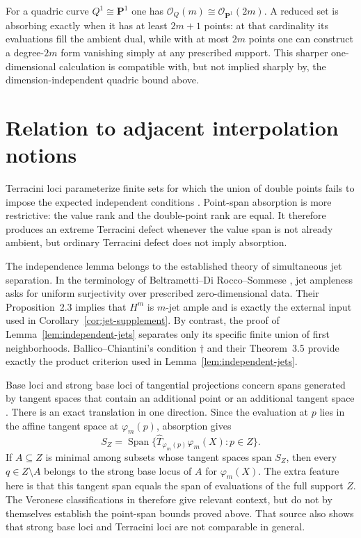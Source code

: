 \documentclass[11pt]{article}
\newcommand{\PP}{\mathbf P}
\newcommand{\cO}{\mathcal O}
\newcommand{\Span}{\operatorname{Span}}
\begin{document}
For a quadric curve $Q^1\cong\PP^1$ one has
$\cO_Q(m)\cong\cO_{\PP^1}(2m)$.  A reduced set is absorbing exactly when
it has at least $2m+1$ points: at that cardinality its evaluations fill the
ambient dual, while with at most $2m$ points one can construct a degree-$2m$
form vanishing simply at any prescribed support.  This sharper
one-dimensional calculation is compatible with, but not implied sharply by,
the dimension-independent quadric bound above.

\section{Relation to adjacent interpolation notions}\label{sec:comparison}

Terracini loci parameterize finite sets for which the union of double points
fails to impose the expected independent conditions
\cite{BallicoChiantini2021,GaluppiEtAl2023}.  Point-span absorption is more
restrictive: the value rank and the double-point rank are equal.  It therefore
produces an extreme Terracini defect whenever the value span is not already
ambient, but ordinary Terracini defect does not imply absorption.

The independence lemma belongs to the established theory of simultaneous
jet separation.  In the terminology of Beltrametti--Di Rocco--Sommese
\cite{BeltramettiDiRoccoSommese1999}, jet ampleness asks for uniform
surjectivity over prescribed zero-dimensional data.  Their
Proposition~2.3 implies that $H^m$ is $m$-jet ample and is exactly the external
input used in Corollary~\ref{cor:jet-supplement}.  By contrast, the proof of
Lemma~\ref{lem:independent-jets} separates only its specific finite union of
first neighborhoods.  Ballico--Chiantini's
condition $\dagger$ and their Theorem~3.5 provide exactly the product
criterion used in Lemma~\ref{lem:independent-jets}.

Base loci and strong base loci of tangential projections concern spans
generated by tangent spaces that contain an additional point or an additional
tangent space \cite{BallicoBrambillaSantarsiero2026}.  There is an exact
translation in one direction.  Since the evaluation at $p$ lies in the affine
tangent space at $\varphi_m(p)$, absorption gives
\[
 S_Z=\Span\{\widehat T_{\varphi_m(p)}\varphi_m(X):p\in Z\}.
\]
If $A\subseteq Z$ is minimal among subsets whose tangent spaces span $S_Z$,
then every $q\in Z\setminus A$ belongs to the strong base locus of $A$ for
$\varphi_m(X)$.  The extra feature here is that this tangent span equals the
span of evaluations of the full support $Z$.  The Veronese classifications in
\cite{BallicoBrambillaSantarsiero2026} therefore give relevant context, but do
not by themselves establish the point-span bounds proved above.  That source
also shows that strong base loci and Terracini loci are not comparable in
general.
\end{document}
